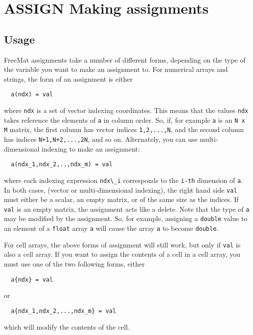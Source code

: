 \section{ASSIGN Making assignments}

\subsection{Usage}

FreeMat assignments take a number of different forms, depending
on the type of the variable you want to make an assignment to.
For numerical arrays and strings, the form of an assignment
is either
\begin{verbatim}
  a(ndx) = val
\end{verbatim}
where \verb|ndx| is a set of vector indexing coordinates.  This means
that the values \verb|ndx| takes reference the elements of \verb|a| in column
order.  So, if, for example \verb|a| is an \verb|N x M| matrix, the first column
has vector indices \verb|1,2,...,N|, and the second column has indices
\verb|N+1,N+2,...,2N|, and so on.  Alternately, you can use multi-dimensional
indexing to make an assignment:
\begin{verbatim}
  a(ndx_1,ndx_2,..,ndx_m) = val
\end{verbatim}
where each indexing expression \verb|ndx\_i| corresponds to the \verb|i-th| dimension
of \verb|a|.  In both cases, (vector or multi-dimensional indexing), the
right hand side \verb|val| must either be a scalar, an empty matrix, or of the
same size as the indices.  If \verb|val| is an empty matrix, the assignment acts
like a delete.  Note that the type of \verb|a| may be modified by the assignment.
So, for example, assigning a \verb|double| value to an element of a \verb|float|
array \verb|a| will cause the array \verb|a| to become \verb|double|.

For cell arrays, the above forms of assignment will still work, but only
if \verb|val| is also a cell array.  If you want to assign the contents of
a cell in a cell array, you must use one of the two following forms, either
\begin{verbatim}
  a{ndx} = val
\end{verbatim}
or
\begin{verbatim}
  a{ndx_1,ndx_2,...,ndx_m} = val
\end{verbatim}
which will modify the contents of the cell.
